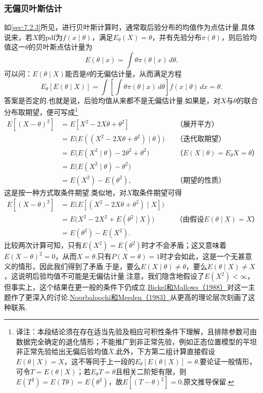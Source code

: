 \subsubsection{无偏贝叶斯估计}\label{sec:7.5.2}
如\autoref{sec:7.2.3}所见，进行贝叶斯计算时，通常取后验分布的均值作为点估计量.具体说来，若$X$的pdf为$f(x\mid\theta)$，满足$E_\theta(X)=\theta$，并有先验分布$\pi(\theta)$，则后验均值这一$\theta$的贝叶斯点估计量为
$$E(\theta\mid x)=\int\theta\pi(\theta\mid x)\,d\theta.$$
可以问：$E(\theta\mid X)$能否是$\theta$的无偏估计量，从而满足方程
$$E_\theta[E(\theta\mid X)]=\int\left[\int\theta\pi(\theta\mid x)\,d\theta\right]f(x\mid\theta)\,dx=\theta.$$
答案是否定的.也就是说，后验均值从来都不是无偏估计量.如果是，对$X$与$\theta$的联合分布取期望，便可写成\footnote{译注：本段结论须在存在适当先验及相应可积性条件下理解，且排除参数可由数据完全确定的退化情形；不能推广到非正常先验，例如正态位置模型的平坦非正常先验给出无偏后验均值$\bar X$.此外，下方第二组计算直接假设$E(\theta\mid X)=X$，这不等同于上一段的$E_\theta[E(\theta\mid X)]=\theta$.要论证一般情形，可令$T=E(\theta\mid X)$；若$E_\theta T=\theta$且相关二阶矩有限，则$E(T^2)=E(T\theta)=E(\theta^2)$，故$E[(T-\theta)^2]=0$.原文推导保留.}
\begin{align*}
E[(X-\theta)^2]&=E[X^2-2X\theta+\theta^2]&&\text{（展开平方）}\\
&=E\bigl(E((X^2-2X\theta+\theta^2)\mid\theta)\bigr)&&\text{（迭代取期望）}\\
&=E\bigl(E(X^2\mid\theta)-2\theta^2+\theta^2\bigr)&&\text{（$E(X\mid\theta)=E_\theta X=\theta$）}\\
&=E\bigl(E(X^2\mid\theta)-\theta^2\bigr)\\
&=E(X^2)-E(\theta^2),&&\text{（期望的性质）}
\end{align*}
这是按一种方式取条件期望.类似地，对$X$取条件期望可得
\begin{align*}
E[(X-\theta)^2]&=E\bigl(E[(X^2-2X\theta+\theta^2)\mid X]\bigr)\\
&=E\bigl(X^2-2X^2+E(\theta^2\mid X)\bigr)&&\text{（由假设$E(\theta\mid X)=X$）}\\
&=E(\theta^2)-E(X^2).
\end{align*}
比较两次计算可知，只有$E(X^2)=E(\theta^2)$时才不会矛盾；这又意味着$E(X-\theta)^2=0$，从而$X=\theta$.只有$P(X=\theta)=1$时才会如此，这是一个无甚意义的情形，因此我们得到了矛盾.于是，要么$E(X\mid\theta)\ne\theta$，要么$E(\theta\mid X)\ne X$，这说明后验均值不可能是无偏估计量.注意，我们隐含地假设了$E(X^2)<\infty$，但事实上，这个结果在更一般的条件下仍成立.\hyperref[bib:source32]{Bickel和Mallows（1988）}对这一主题作了更深入的讨论.\hyperref[bib:source234]{Noorbaloochi和Meeden（1983）}从更高的理论层次刻画了这种联系.

